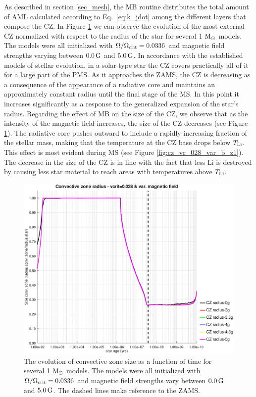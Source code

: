 \documentclass[fleqn,usenatbib]{mnras}
\begin{document}
As described in section \ref{sec_mesh}, the MB routine distributes the total amount of AML calculated according to Eq.~\ref{eq:k_jdot} among the different layers that compose the CZ. In Figure \ref{fig:cz_vc_028_var_b} we can observe the evolution of the most external CZ normalized with respect to the radius of the star for several 1 $\mathrm{M}_\odot$ models. The models were all initialized with $\Omega / \Omega_{\mathrm{crit}}=0.0336$ and magnetic field strengths varying between $0.0\,\mathrm{G}$ and $5.0\,\mathrm{G}$. In accordance with the established models of stellar evolution, in a solar-type star the CZ covers practically all of it for a large part of the PMS. As it approaches the ZAMS, the CZ is decreasing as a consequence of the appearance of a radiative core and maintains an approximately constant radius until the final stage of the MS. In this point it increases significantly as a response to the generalized expansion of the star's radius. Regarding the effect of MB on the size of the CZ, we observe that as the intensity of the magnetic field increases, the size of the CZ decreases (see Figure \ref{fig:cz_vc_028_var_b}). The radiative core pushes outward to include a rapidly increasing fraction of the stellar mass, making that the temperature at the CZ base drops below $T_{\mathrm{Li}}$. This effect is most evident during MS (see Figure \ref{fig:cz_vc_028_var_b_z1}). The decrease in the size of the CZ is in line with the fact that less Li is destroyed by causing less star material to reach areas with temperatures above $T_{\mathrm{Li}}$.\par

\begin{figure}
	\includegraphics[trim = 30mm 15mm 20mm 15mm, clip,width=\columnwidth]{figures/cz_vc_028_var_g.eps}
    \caption{The evolution of convective zone size as a function of time for several 1 $\mathrm{M}_\odot$ models. The models were all initialized with $\Omega / \Omega_{\mathrm{crit}}=0.0336$ and magnetic field strengths vary between $0.0\,\mathrm{G}$ and $5.0\,\mathrm{G}$. The dashed lines make reference to the ZAMS.}
    \label{fig:cz_vc_028_var_b}
\end{figure}
\end{document}
